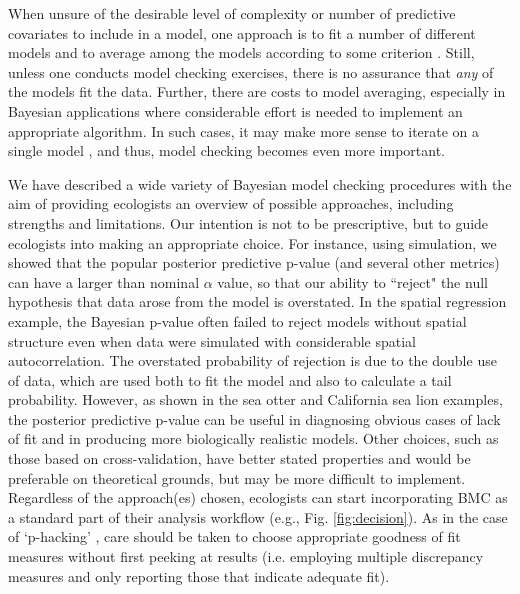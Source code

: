 \documentclass[12pt,english]{article}
\begin{document}
\begin{spacing}{1.9}
When unsure of the desirable level of complexity or number of
predictive covariates to include in a model, one approach is to fit a
number of different models and to average among the models according
to some criterion
\citep[e.g.,][]{Green1995,HoetingEtAl1999,LinkBarker2006}. Still,
unless one conducts model checking exercises, there is no assurance
that \textit{any} of the models fit the data.  Further, there are
costs to model averaging, especially in Bayesian applications where
considerable effort is needed to implement an appropriate algorithm.
In such cases, it may make more sense to iterate on a single model
\citep{VerHoefBoveng2015}, and thus, model checking becomes even more
important.

We have described a wide variety of Bayesian model checking procedures
with the aim of providing ecologists an overview of possible
approaches, including strengths and limitations.  Our intention is not
to be prescriptive, but to guide ecologists into making an appropriate
choice. For instance, using simulation, we showed that the popular
posterior predictive p-value (and several other metrics) can have a larger
than nominal $\alpha$ value, so that our ability to
``reject" the null hypothesis that data arose from
the model is overstated.  In the spatial regression example, the Bayesian p-value
often failed to reject models without spatial structure even when data
were simulated with considerable spatial autocorrelation.  The
overstated probability of rejection is due to the double use of data, which are used
both to fit the model and also to calculate a tail probability.
However, as shown in the sea otter and California sea lion examples,
the posterior predictive p-value can be useful in diagnosing obvious
cases of lack of fit and in producing more biologically realistic
models.  Other choices, such as those based on cross-validation, have
better stated properties and would be preferable on theoretical
grounds, but may be more difficult to implement.  Regardless of the
approach(es) chosen, ecologists can start incorporating BMC as a
standard part of their analysis workflow (e.g.,
Fig. \ref{fig:decision}). As in the case of `p-hacking' \citep{HeadEtAl2015}, care should be taken
to choose appropriate goodness of fit measures without first peeking
at results (i.e. employing multiple
discrepancy measures and only reporting those that indicate adequate fit).


\end{spacing}
\end{document}
